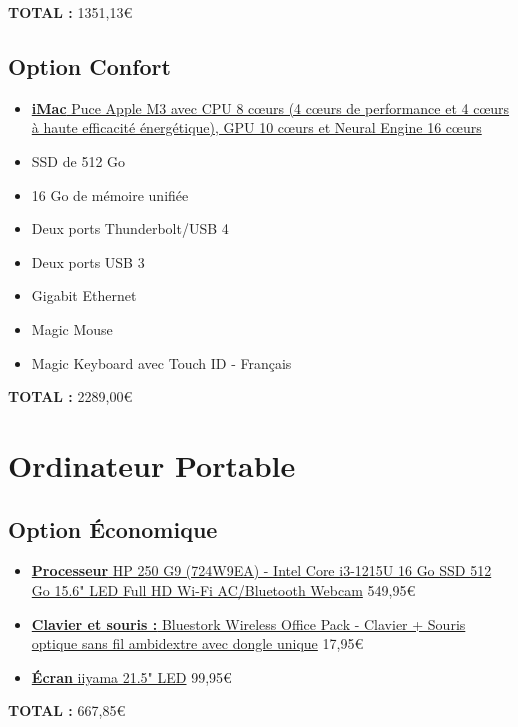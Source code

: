 \vspace{5px}
\textbf{TOTAL :} 1351,13\euro
\label{2.1.2}

\subsection{Option Confort}
\begin{itemize}
	\item \href{https://www.apple.com/fr/shop/buy-mac/imac/bleu-24-pouces-puce-apple-m3-avec-cpu-8-c%C5%93urs-et-gpu-10-c%C5%93urs-8-go-de-m%C3%A9moire-256go}{\textbf{iMac} Puce Apple M3 avec CPU 8 cœurs (4 cœurs de performance et 4 cœurs à haute efficacité énergétique), GPU 10 cœurs et Neural Engine 16 cœurs}
	\item SSD de 512 Go
	\item 16 Go de mémoire unifiée
	\item Deux ports Thunderbolt/USB 4
	\item Deux ports USB 3
	\item Gigabit Ethernet
	\item Magic Mouse
	\item Magic Keyboard avec Touch ID - Français
\end{itemize}
\vspace{5px}
\textbf{TOTAL :} 2289,00\euro

\section{Ordinateur Portable}

\subsection{Option Économique}

\begin{itemize}
	\item \href{https://www.ldlc.com/fiche/PB00575287.html}{\textbf{Processeur} HP 250 G9 (724W9EA) - Intel Core i3-1215U 16 Go SSD 512 Go 15.6" LED Full HD Wi-Fi AC/Bluetooth Webcam} 549,95\euro
	\item \href{https://www.ldlc.com/fiche/PB00266529.html?offerId=AR201903040050}{\textbf{Clavier et souris :} Bluestork Wireless Office Pack - Clavier + Souris optique sans fil ambidextre avec dongle unique} 17,95\euro
	\item \href{https://www.ldlc.com/fiche/PB00543634.html}{\textbf{Écran} iiyama 21.5" LED} 99,95\euro
\end{itemize}
\vspace{5px}
\textbf{TOTAL :} 667,85\euro
